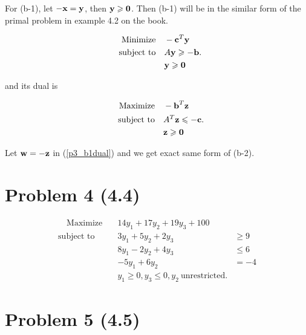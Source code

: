 \documentclass[12pt]{article}
\begin{document}
\begin{enumerate}
For (b-1), let $-\textbf x = \textbf y$, then $\textbf y \geqslant \textbf 0$. Then (b-1) will be in the similar form of the primal problem in example 4.2 on the book.

\begin{equation}\label{p3_b1}
\begin{aligned}
 \quad \text{Minimize} \quad & -\textbf c^T\textbf y\\
\text{subject\  to} \quad & A\textbf y \geqslant -\textbf b. \\
& \textbf y \geqslant \textbf 0
\end{aligned}
\end{equation}

and its dual is 

\begin{equation}\label{p3_b1dual}
\begin{aligned}
 \quad \text{Maximize} \quad & -\textbf b^T\textbf z\\
\text{subject\  to} \quad & A^T\textbf z \leqslant -\textbf c. \\
& \textbf z \geqslant \textbf 0
\end{aligned}
\end{equation}

Let $\textbf w = -\textbf z $ in (\ref{p3_b1dual}) and we get exact same form of (b-2).

\end{enumerate}

\section*{Problem 4 (4.4)}

\begin{equation}\label{p4}
\begin{aligned}
 \quad \text{Maximize} \quad & 14y_1 + 17 y_2 + 19 y_3 + 100 \\
\text{subject\  to} \quad & 3y_1 + 5y_2 + 2y_3 & \geqslant 9 \\
& 8y_1 -2y_2 + 4y_3 & \leqslant 6 \\
& -5y_1 + 6y_2 & = -4 \\
& y_1 \geqslant 0, y_3 \leqslant 0, y_2 \ \text{unrestricted}.
\end{aligned}
\end{equation}

\section*{Problem 5 (4.5)}
\end{document}
